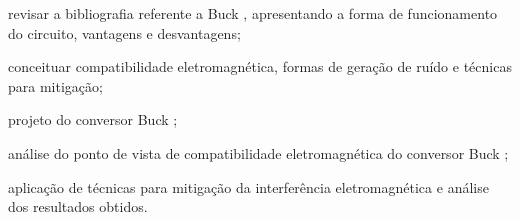         \begin{alineas}
            
            \item revisar a bibliografia referente a Buck \interleaved, apresentando a forma de funcionamento do circuito, vantagens e desvantagens;
            
            \item conceituar compatibilidade eletromagnética, formas de geração de ruído e técnicas para mitigação;
            
            \item projeto do conversor Buck \interleaved;
            
            
            \item análise do ponto de vista de compatibilidade eletromagnética do conversor Buck \interleaved;
            
            \item aplicação de técnicas para mitigação da interferência eletromagnética e análise dos resultados obtidos.
            
        \end{alineas}
